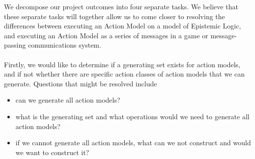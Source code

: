 We decompose our project outcomes into four separate tasks.
We believe that these separate tasks will together allow us to come closer to
resolving the differences between executing an Action Model on a model of
Epistemic Logic, and executing an Action Model as a series of messages in a game
or message-passing communications system.\\
\\
Firstly, we would like to determine if a generating set exists for action
models, and if not whether there are specific action classes of action models
that we can generate.
Questions that might be resolved include
\begin{itemize}
	\item can we generate all action models?
	\item what is the generating set and what operations would we need to generate
	all action models?
	\item if we cannot generate all action models, what can we not construct and
	would we want to construct it?
\end{itemize}

